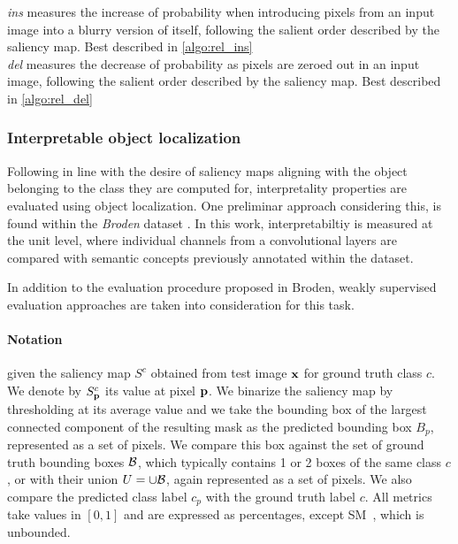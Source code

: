 \emph{\gls{ins}} measures the increase of probability when introducing pixels from an input image 
into a blurry version of itself, following the salient order described by the saliency map. Best 
described in \autoref{algo:rel_ins}\\

\emph{\gls{del}} measures the decrease of probability as pixels are zeroed out in an input image, 
following the salient order described by the saliency map. Best 
described in \autoref{algo:rel_del}\\


\subsubsection{Interpretable object localization}
\label{sec:loc-metrics}
Following in line with the desire of saliency maps aligning with the object belonging to the class 
they are computed for, interpretality properties are evaluated using object localization.
One preliminar approach considering this, is found within the \emph{Broden} dataset 
\autocite{bau2017network}. In this work, interpretabiltiy is measured at the unit level, where 
individual channels from a convolutional layers are compared with semantic concepts previously 
annotated within the dataset. 

In addition to the evaluation procedure proposed in Broden, weakly supervised evaluation approaches 
are taken into consideration for this task. 

\paragraph{Notation} given the saliency map $S^c$ obtained from test image $\mathbf{x}$ for ground truth 
class $c$. We denote by $S^c_{\mathbf{p}}$ its value at pixel $\mathbf{p}$. We binarize the saliency map by 
thresholding at its average value and we take the bounding box of the largest connected component 
of the resulting mask as the predicted bounding box $B_p$, represented as a set of pixels. We 
compare this box against the set of ground truth bounding boxes $\mathcal{B}$, which typically contains 1 
or 2 boxes of the same class $c$, or with their union $U = \cup \mathcal{B}$, again represented as a set 
of pixels. We also compare the predicted class label $c_p$ with the ground truth label $c$. All 
metrics take values in $[0,1]$ and are expressed as percentages, except SM~, which is 
unbounded.

